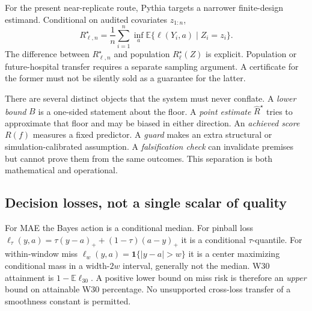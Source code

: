 \documentclass[11pt]{article}
\newcommand{\Rstar}{R^{\star}}
\begin{document}
For the present near-replicate route, Pythia targets a narrower finite-design estimand. Conditional on audited covariates $z_{1:n}$,
\begin{equation}
\Rstar_{\ell,n}=\frac1n\sum_{i=1}^{n}\inf_a\mathbb E\{\ell(Y_i,a)\mid Z_i=z_i\}.
\end{equation}
The difference between $\Rstar_{\ell,n}$ and population $\Rstar_{\ell}(Z)$ is explicit. Population or future-hospital transfer requires a separate sampling argument. A certificate for the former must not be silently sold as a guarantee for the latter.

There are several distinct objects that the system must never conflate. A \emph{lower bound} $B$ is a one-sided statement about the floor. A \emph{point estimate} $\widehat R^{\star}$ tries to approximate that floor and may be biased in either direction. An \emph{achieved score} $R(f)$ measures a fixed predictor. A \emph{guard} makes an extra structural or simulation-calibrated assumption. A \emph{falsification check} can invalidate premises but cannot prove them from the same outcomes. This separation is both mathematical and operational.

\subsection{Decision losses, not a single scalar of quality}
For MAE the Bayes action is a conditional median. For pinball loss $\ell_\tau(y,a)=\tau(y-a)_++(1-\tau)(a-y)_+$ it is a conditional $\tau$-quantile. For within-window miss $\ell_w(y,a)=\mathbf 1\{|y-a|>w\}$ it is a center maximizing conditional mass in a width-$2w$ interval, generally not the median. W30 attainment is $1-\mathbb E\ell_{30}$. A positive lower bound on miss risk is therefore an \emph{upper} bound on attainable W30 percentage. No unsupported cross-loss transfer of a smoothness constant is permitted.
\end{document}
